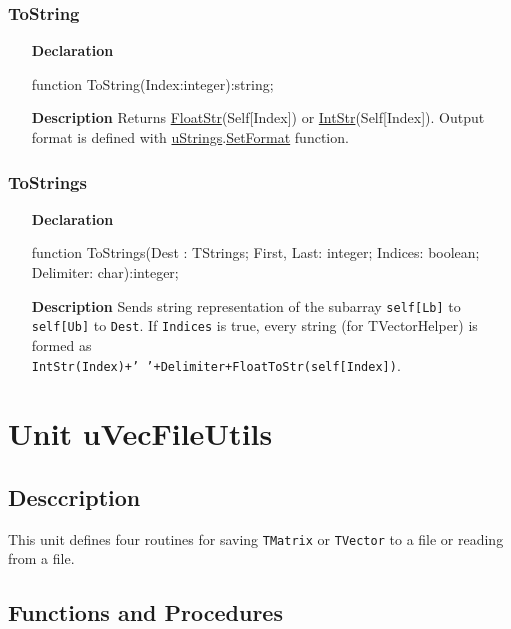 \documentclass[12pt,a4paper,oneside]{report}
\newcommand{\lmatha}[1]{   %
	\marginpar{\vspace{#1} 
		\begin{flushright}
			LMath 0.5
	\end{flushright} }
}
\newcommand{\declarationitem}[1]{\textbf{#1}}
\newcommand{\descriptiontitle}[1]{\textbf{#1}}
\newcommand{\code}[1]{\texttt{#1}}
\begin{document}
\subsubsection{ToString}
\begin{itemize}
	\item[\declarationitem{Declaration}\hfill]
	\begin{flushleft}
     function ToString(Index:integer):string;
	\end{flushleft}
	\item[\descriptiontitle{Description}\hfill]
	Returns \hyperref[ustrings-FloatStr]{FloatStr}(Self[Index]) or \hyperref[ustrings-IntStr]{IntStr}(Self[Index]). Output format is defined with \hyperref[ustrings]{uStrings}.\hyperref[ustrings-SetFormat]{SetFormat} function.
\end{itemize}
\subsubsection{ToStrings}
\begin{itemize}
	\item[\declarationitem{Declaration}\hfill]
	\begin{flushleft}
     function ToStrings(Dest : TStrings; First, Last: integer; Indices: boolean; Delimiter: char):integer;
	\end{flushleft}
	\item[\descriptiontitle{Description}\hfill]
     Sends string representation of the subarray \code{self[Lb]} to \code{self[Ub]} to \code{Dest}. If \code{Indices} is true, every string (for TVectorHelper) is formed as \\
     \code{IntStr(Index)+' '+Delimiter+FloatToStr(self[Index])}.
\end{itemize}
\section{Unit uVecFileUtils}\lmatha{-20pt}
\label{sec:unit-uvecfileutils}
\subsection{Desccription}
This unit defines four routines for saving \code{TMatrix} or \code{TVector} to a file or reading from a file.
\subsection{Functions and Procedures}
\end{document}
